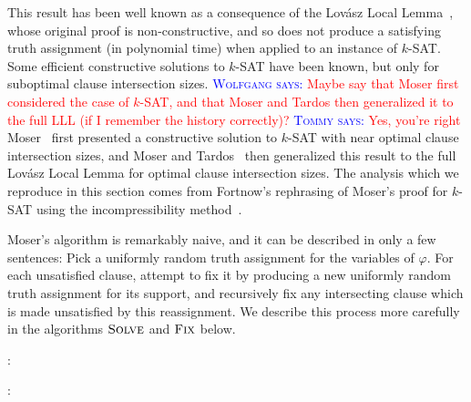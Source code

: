 \documentclass{patmorin}
\newcommand{\aremark}[3]{\textcolor{blue}{\textsc{#1 #2:}}
  \textcolor{red}{\textsf{#3}}}
\newcommand{\tommy}[2][says]{\aremark{Tommy}{#1}{#2}}
\newcommand{\wolfgang}[2][says]{\aremark{Wolfgang}{#1}{#2}}
\begin{document}
This result has been well known as a consequence of the Lov\'{a}sz
Local Lemma~\cite{lovasz:locallemma}, whose original proof is
non-constructive, and so does not produce a satisfying truth
assignment (in polynomial time) when applied to an instance of
$k$-SAT. Some efficient constructive solutions to $k$-SAT have been
known, but only for suboptimal clause intersection sizes.
\wolfgang{Maybe say that Moser first considered the case of $k$-SAT,
  and that Moser and Tardos then generalized it to the full LLL (if I
  remember the history correctly)?} \tommy{Yes, you're right}
Moser~\cite{moser:ksat} first presented a constructive solution to
$k$-SAT with near optimal clause intersection sizes, and Moser and
Tardos~\cite{moser:locallemma} then generalized this result to the
full Lov\'{a}sz Local Lemma for optimal clause intersection sizes. The
analysis which we reproduce in this section comes from Fortnow's
rephrasing of Moser's proof for $k$-SAT using the incompressibility
method~\cite{fortnow:ksat}.

Moser's algorithm is remarkably naive, and it can be described in only a
few sentences: Pick a uniformly random truth assignment for the
variables of $\varphi$. For each unsatisfied clause, attempt to fix it
by producing a new uniformly random truth assignment for its support,
and recursively fix any intersecting clause which is made unsatisfied
by this reassignment. We describe this process more carefully in the
algorithms $\textsc{Solve}$ and $\textsc{Fix}$ below.

:
\begin{algorithmic}[1]
  \ENDWHILE
  \RETURN{$\alpha$}
\end{algorithmic}

:
\begin{algorithmic}[1]
  \ENDWHILE
  \RETURN{$\alpha$}
\end{algorithmic}
\end{document}
